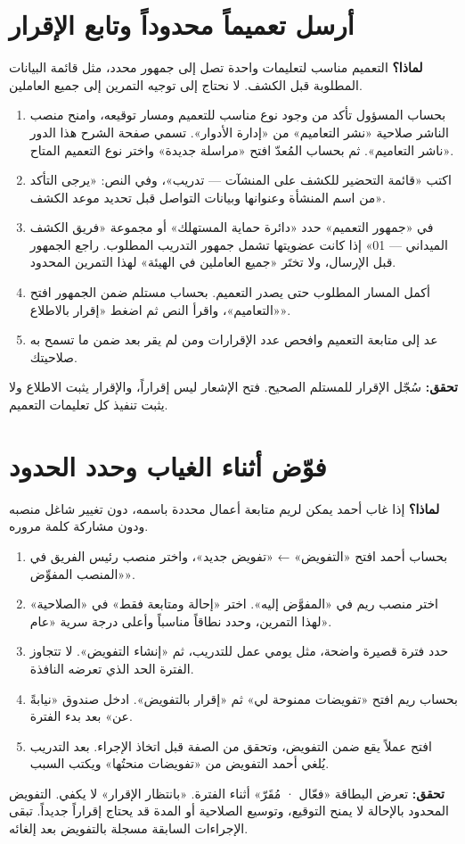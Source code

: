 \section{أرسل تعميماً محدوداً وتابع الإقرار}
\label{sec:circular}
\textbf{لماذا؟} التعميم مناسب لتعليمات واحدة تصل إلى جمهور محدد، مثل قائمة البيانات المطلوبة قبل الكشف. لا نحتاج إلى توجيه التمرين إلى جميع العاملين.
\begin{enumerate}
\item بحساب المسؤول تأكد من وجود نوع مناسب للتعميم ومسار توقيعه، وامنح منصب الناشر صلاحية «نشر التعاميم» من «إدارة الأدوار». تسمي صفحة الشرح هذا الدور «ناشر التعاميم». ثم بحساب المُعدّ افتح «مراسلة جديدة» واختر نوع التعميم المتاح.
\item اكتب «قائمة التحضير للكشف على المنشآت — تدريب»، وفي النص: «يرجى التأكد من اسم المنشأة وعنوانها وبيانات التواصل قبل تحديد موعد الكشف».
\item في «جمهور التعميم» حدد «دائرة حماية المستهلك» أو مجموعة «فريق الكشف الميداني — 01» إذا كانت عضويتها تشمل جمهور التدريب المطلوب. راجع الجمهور قبل الإرسال، ولا تختَر «جميع العاملين في الهيئة» لهذا التمرين المحدود.
\item أكمل المسار المطلوب حتى يصدر التعميم. بحساب مستلم ضمن الجمهور افتح «التعاميم»، واقرأ النص ثم اضغط «إقرار بالاطلاع».
\item عد إلى متابعة التعميم وافحص عدد الإقرارات ومن لم يقر بعد ضمن ما تسمح به صلاحيتك.
\end{enumerate}
\textbf{تحقق:} سُجّل الإقرار للمستلم الصحيح. فتح الإشعار ليس إقراراً، والإقرار يثبت الاطلاع ولا يثبت تنفيذ كل تعليمات التعميم.

\section{فوّض أثناء الغياب وحدد الحدود}
\label{sec:delegation}
\textbf{لماذا؟} إذا غاب أحمد يمكن لريم متابعة أعمال محددة باسمه، دون تغيير شاغل منصبه ودون مشاركة كلمة مروره.
\begin{enumerate}
\item بحساب أحمد افتح «التفويض» ← «تفويض جديد»، واختر منصب رئيس الفريق في «المنصب المفوِّض».
\item اختر منصب ريم في «المفوَّض إليه». اختر «إحالة ومتابعة فقط» في «الصلاحية» لهذا التمرين، وحدد نطاقاً مناسباً وأعلى درجة سرية «عام».
\item حدد فترة قصيرة واضحة، مثل يومي عمل للتدريب، ثم «إنشاء التفويض». لا تتجاوز الفترة الحد الذي تعرضه النافذة.
\item بحساب ريم افتح «تفويضات ممنوحة لي» ثم «إقرار بالتفويض». ادخل صندوق «نيابةً عن» بعد بدء الفترة.
\item افتح عملاً يقع ضمن التفويض، وتحقق من الصفة قبل اتخاذ الإجراء. بعد التدريب يُلغي أحمد التفويض من «تفويضات منحتُها» ويكتب السبب.
\end{enumerate}
\textbf{تحقق:} تعرض البطاقة «فعّال · مُقَرّ» أثناء الفترة. «بانتظار الإقرار» لا يكفي. التفويض المحدود بالإحالة لا يمنح التوقيع، وتوسيع الصلاحية أو المدة قد يحتاج إقراراً جديداً. تبقى الإجراءات السابقة مسجلة بالتفويض بعد إلغائه.


